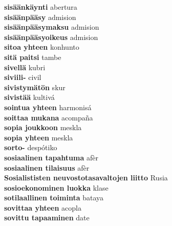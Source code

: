 \textbf{ sisäänkäynti  } abertura \\
\textbf{ sisäänpääsy  } admision \\
\textbf{ sisäänpääsymaksu  } admision \\
\textbf{ sisäänpääsyoikeus  } admision \\
\textbf{ sitoa yhteen  } konhunto \\
\textbf{ sitä paitsi  } tambe \\
\textbf{ sivellä  } kubri \\
\textbf{ siviili-  } civil \\
\textbf{ sivistymätön  } skur \\
\textbf{ sivistää  } kultivá \\
\textbf{ sointua yhteen  } harmonisá \\
\textbf{ soittaa mukana  } acompaña \\
\textbf{ sopia joukkoon  } meskla \\
\textbf{ sopia yhteen  } meskla \\
\textbf{ sorto-  } despótiko \\
\textbf{ sosiaalinen tapahtuma  } afèr \\
\textbf{ sosiaalinen tilaisuus  } afèr \\
\textbf{ Sosialististen neuvostotasavaltojen liitto  } Rusia \\
\textbf{ sosioekonominen luokka  } klase \\
\textbf{ sotilaallinen toiminta  } bataya \\
\textbf{ sovittaa yhteen  } acopla \\
\textbf{ sovittu tapaaminen  } date \\
